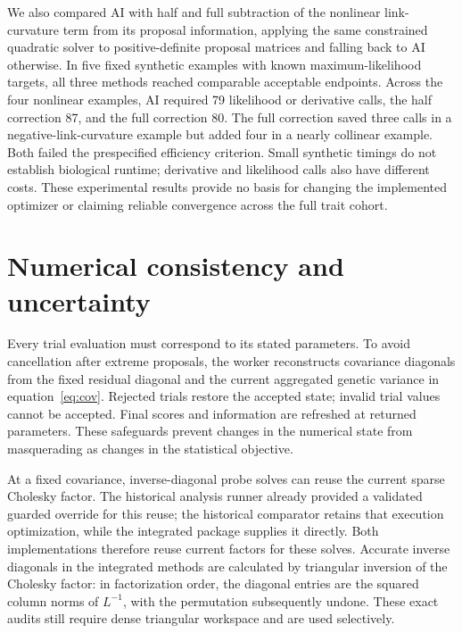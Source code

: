 \documentclass[11pt]{article}
\begin{document}
We also compared AI with half and full subtraction of the nonlinear link-curvature term from its proposal information, applying the same constrained quadratic solver to positive-definite proposal matrices and falling back to AI otherwise. In five fixed synthetic examples with known maximum-likelihood targets, all three methods reached comparable acceptable endpoints. Across the four nonlinear examples, AI required 79 likelihood or derivative calls, the half correction 87, and the full correction 80. The full correction saved three calls in a negative-link-curvature example but added four in a nearly collinear example. Both failed the prespecified efficiency criterion. Small synthetic timings do not establish biological runtime; derivative and likelihood calls also have different costs. These experimental results provide no basis for changing the implemented optimizer or claiming reliable convergence across the full trait cohort.

\section{Numerical consistency and uncertainty}
Every trial evaluation must correspond to its stated parameters. To avoid cancellation after extreme proposals, the worker reconstructs covariance diagonals from the fixed residual diagonal and the current aggregated genetic variance in equation~\eqref{eq:cov}. Rejected trials restore the accepted state; invalid trial values cannot be accepted. Final scores and information are refreshed at returned parameters. These safeguards prevent changes in the numerical state from masquerading as changes in the statistical objective.

At a fixed covariance, inverse-diagonal probe solves can reuse the current sparse Cholesky factor. The historical analysis runner already provided a validated guarded override for this reuse; the historical comparator retains that execution optimization, while the integrated package supplies it directly. Both implementations therefore reuse current factors for these solves. Accurate inverse diagonals in the integrated methods are calculated by triangular inversion of the Cholesky factor: in factorization order, the diagonal entries are the squared column norms of $L^{-1}$, with the permutation subsequently undone. These exact audits still require dense triangular workspace and are used selectively.
\end{document}
